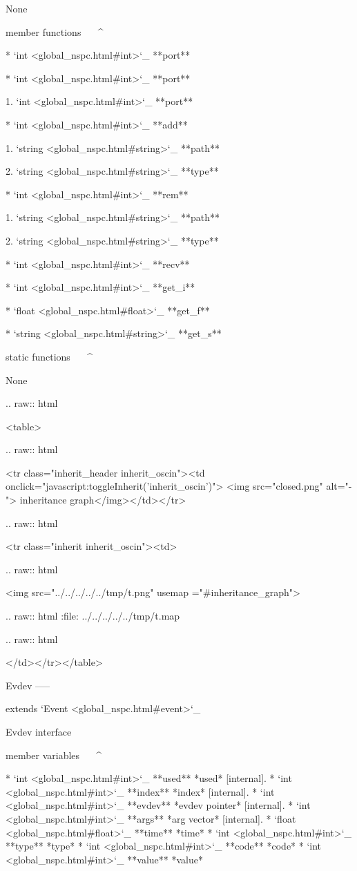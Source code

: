 	None

member functions
^^^^^^^^^^^^^^^^

	* `int <global_nspc.html#int>`_ **port**

	* `int <global_nspc.html#int>`_ **port**

		1. `int <global_nspc.html#int>`_ **port**

	* `int <global_nspc.html#int>`_ **add**

		1. `string <global_nspc.html#string>`_ **path**

		2. `string <global_nspc.html#string>`_ **type**

	* `int <global_nspc.html#int>`_ **rem**

		1. `string <global_nspc.html#string>`_ **path**

		2. `string <global_nspc.html#string>`_ **type**

	* `int <global_nspc.html#int>`_ **recv**

	* `int <global_nspc.html#int>`_ **get_i**

	* `float <global_nspc.html#float>`_ **get_f**

	* `string <global_nspc.html#string>`_ **get_s**

static functions
^^^^^^^^^^^^^^^^


	None


  .. raw:: html

   <table>


  .. raw:: html

   <tr class="inherit_header inherit_oscin"><td onclick="javascript:toggleInherit('inherit_oscin')"> <img src="closed.png" alt="-"> inheritance graph</img></td></tr>


  .. raw:: html

   <tr class="inherit inherit_oscin"><td>


  .. raw:: html

   <img src="../../../../../tmp/t.png" usemap ="#inheritance_graph">


  .. raw:: html
   :file:   ../../../../../tmp/t.map


  .. raw:: html

   </td></tr></table>

Evdev
-----

extends `Event <global_nspc.html#event>`_ 

Evdev interface

member variables
^^^^^^^^^^^^^^^^

	* `int <global_nspc.html#int>`_ **used** *used*  [internal].
	* `int <global_nspc.html#int>`_ **index** *index*  [internal].
	* `int <global_nspc.html#int>`_ **evdev** *evdev pointer*  [internal].
	* `int <global_nspc.html#int>`_ **args** *arg vector*  [internal].
	* `float <global_nspc.html#float>`_ **time** *time* 
	* `int <global_nspc.html#int>`_ **type** *type* 
	* `int <global_nspc.html#int>`_ **code** *code* 
	* `int <global_nspc.html#int>`_ **value** *value* 


